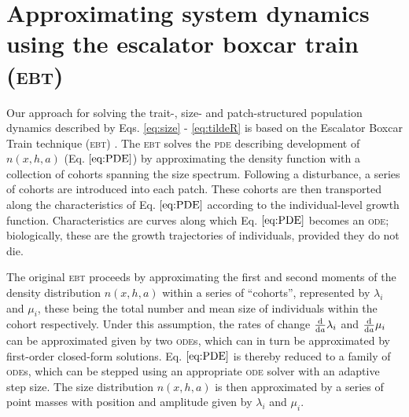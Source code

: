 \documentclass[10pt,twoside]{article}
\begin{document}
\section{Approximating system dynamics using the escalator boxcar train
(\textsc{ebt})}\label{approximating-system-dynamics-using-the-escalator-boxcar-train-ebt}

Our approach for solving the trait-, size- and patch-structured
population dynamics described by Eqs. \ref{eq:size} - \ref{eq:tildeR} is
based on the Escalator Boxcar Train technique (\textsc{ebt})
\citep{Deroos-1997, Deroos-1992, Deroos-1988}. The \textsc{ebt} solves the \textsc{pde}
describing development of \(n(x,h,a)\) (Eq. \(\ref{eq:PDE}\)) by
approximating the density function with a collection of cohorts spanning
the size spectrum. Following a disturbance, a series of cohorts are
introduced into each patch. These cohorts are then transported along the
characteristics of Eq. \(\ref{eq:PDE}\) according to the
individual-level growth function. Characteristics are curves along which
Eq. \(\ref{eq:PDE}\) becomes an \textsc{ode};
biologically, these are the growth trajectories of individuals, provided
they do not die.

The original \textsc{ebt} \citep{Deroos-1997, Deroos-1992, Deroos-1988} proceeds
by approximating the first and second moments of the density
distribution \(n \left( x,h,a \right)\) within a series of ``cohorts'',
represented by \(\lambda_i\) and \(\mu_i\), these being the total number
and mean size of individuals within the cohort respectively. Under this
assumption, the rates of change \(\frac{\rm d} {{\rm d}a} \lambda_i\)
and \(\frac{\rm d} {{\rm d}a} \mu_i\) can be approximated given by two
\textsc{ode}s, which can in turn be approximated by first-order closed-form
solutions. Eq. \(\ref{eq:PDE}\) is thereby reduced to a family of \textsc{ode}s,
which can be stepped using an appropriate \textsc{ode} solver with an adaptive
step size. The size distribution \(n(x,h,a)\) is then approximated by a
series of point masses with position and amplitude given by
\(\lambda_i\) and \(\mu_i\).
\end{document}
